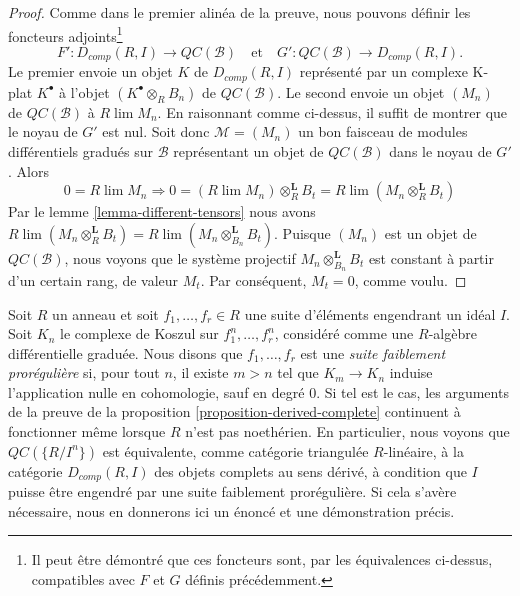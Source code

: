 \begin{proof}
\medskip\noindent
Comme dans le premier alinéa de la preuve, nous pouvons définir les
foncteurs adjoints\footnote{Il peut être démontré que ces foncteurs
sont, par les équivalences ci-dessus, compatibles avec $F$ et $G$ définis précédemment.}
$$
F' : D_{comp}(R, I) \longrightarrow \mathit{QC}(\mathcal{B})
\quad\text{et}\quad
G' : \mathit{QC}(\mathcal{B}) \longrightarrow D_{comp}(R, I).
$$
Le premier envoie un objet $K$ de $D_{comp}(R, I)$ représenté par un
complexe K-plat $K^\bullet$ à l'objet $(K^\bullet \otimes_R B_n)$ de
$\mathit{QC}(\mathcal{B})$. Le second envoie un objet
$(M_n)$ de $\mathit{QC}(\mathcal{B})$ à $R\lim M_n$. En raisonnant
comme ci-dessus, il suffit de montrer que le noyau de $G'$ est nul. Soit donc
$\mathcal{M} = (M_n)$ un bon faisceau de modules différentiels gradués
sur $\mathcal{B}$ représentant un objet de
$\mathit{QC}(\mathcal{B})$ dans le noyau de $G'$. Alors
$$ 0 =
R\lim M_n \Rightarrow 0 =
(R\lim M_n) \otimes_R^\mathbf{L} B_t =
R\lim (M_n \otimes_R^\mathbf{L} B_t)
$$ Par le lemme
\ref{lemma-different-tensors} nous avons
$R\lim (M_n \otimes_R^\mathbf{L} B_t) =
R\lim (M_n \otimes_{B_n}^\mathbf{L} B_t)$. Puisque
$(M_n)$ est un objet de $\mathit{QC}(\mathcal{B})$, nous voyons que le système
projectif $M_n \otimes_{B_n}^\mathbf{L} B_t$ est constant à partir d'un
certain rang, de valeur $M_t$. Par conséquent, $M_t = 0$, comme voulu.
\end{proof}

\begin{remark}
\label{remark-proregular} Soit
$R$ un anneau et soit $f_1, \ldots, f_r \in R$ une suite d'éléments engendrant un idéal
$I$. Soit $K_n$ le complexe de Koszul sur
$f_1^n, \ldots, f_r^n$, considéré comme une $R$-algèbre différentielle graduée. Nous disons que
$f_1, \ldots, f_r$ est une {\it suite faiblement prorégulière} si, pour tout
$n$, il existe $m > n$ tel que $K_m \to K_n$ induise l'application
nulle en cohomologie, sauf en degré $0$. Si tel est le cas, les arguments de la
preuve de la proposition \ref{proposition-derived-complete} continuent à fonctionner
même lorsque $R$ n'est pas noethérien. En particulier, nous
voyons que $\mathit{QC}(\{R/I^n\})$ est équivalente,
comme catégorie triangulée $R$-linéaire, à la catégorie
$D_{comp}(R, I)$ des objets complets au sens dérivé, à condition que
$I$ puisse être engendré par une suite faiblement prorégulière. Si cela s'avère
nécessaire, nous en donnerons ici un énoncé et une démonstration précis.
\end{remark}















